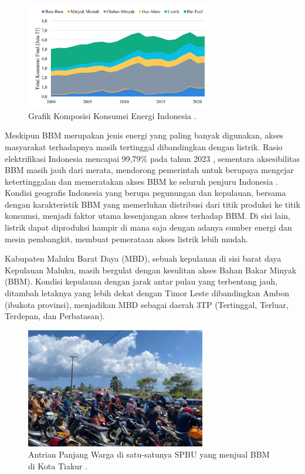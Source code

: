     \begin{figure}[htbp]
		\centerline{\includegraphics[width=0.75\textwidth]{grafik/komposisi_konsumsi_energi.png}}
        \setlength{\belowcaptionskip}{-10pt}
		\caption{Grafik Komposisi Konsumsi Energi Indonesia \citep{IEA2024World}.}
		\label{energy_cmix}
	\end{figure}

    Meskipun BBM merupakan jenis energi yang paling banyak digunakan, akses masyarakat terhadapnya masih tertinggal dibandingkan dengan listrik. Rasio elektrifikasi Indonesia mencapai 99,79\% pada tahun 2023 \citep{Syofiadi2024Sepanjang}, sementara aksesibilitas BBM masih jauh dari merata, mendorong pemerintah untuk berupaya mengejar ketertinggalan dan memeratakan akses BBM ke seluruh penjuru Indonesia \citep{bangun_SPBU}. Kondisi geografis Indonesia yang berupa pegunungan dan kepulauan, bersama dengan karakteristik BBM yang memerlukan distribusi dari titik produksi ke titik konsumsi, menjadi faktor utama kesenjangan akses terhadap BBM. Di sisi lain, listrik dapat diproduksi hampir di mana saja dengan adanya sumber energi dan mesin pembangkit, membuat pemerataan akses listrik lebih mudah.

    Kabupaten Maluku Barat Daya (MBD), sebuah kepulauan di sisi barat daya Kepulauan Maluku, masih bergulat dengan kesulitan akses Bahan Bakar Minyak (BBM). Kondisi kepulauan dengan jarak antar pulau yang terbentang jauh, ditambah letaknya yang lebih dekat dengan Timor Leste dibandingkan Ambon (ibukota provinsi), menjadikan MBD sebagai daerah 3TP (Tertinggal, Terluar, Terdepan, dan Perbatasan).
    
\begin{figure}[htbp]
		\centerline{\includegraphics[width=0.7\textwidth]{gambar/antriBBM-MBD.jpg}}
        \setlength{\belowcaptionskip}{-10pt}
		\caption{Antrian Panjang Warga di  satu-satunya SPBU yang menjual BBM di Kota Tiakur \citep{Kurniati_2024}.}
		\label{antrian-bbm-mbd}
	\end{figure}
 
